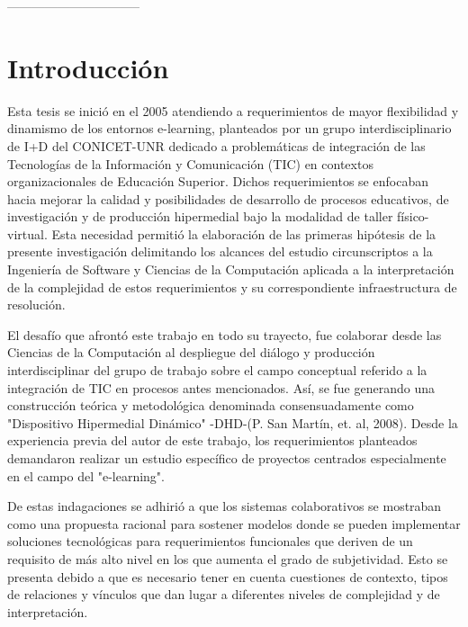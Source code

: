 --------------------------------
\parskip=0.6cm

\chapter{Introducción}\label{cap:1}


Esta tesis se inició en el 2005 atendiendo a requerimientos de mayor flexibilidad y dinamismo de los entornos e-learning, planteados por un grupo interdisciplinario de I+D del CONICET-UNR dedicado a problemáticas de integración de las Tecnologías de la Información y Comunicación (TIC) en contextos organizacionales de Educación Superior. 
Dichos requerimientos se enfocaban hacia mejorar la calidad y posibilidades de desarrollo de procesos educativos, de investigación y de producción hipermedial bajo la
modalidad de taller físico-virtual. Esta necesidad permitió la elaboración de las
primeras hipótesis de la presente investigación delimitando los alcances del estudio circunscriptos a la
Ingeniería de Software y Ciencias de la Computación aplicada a la interpretación
de la complejidad de estos requerimientos y su correspondiente
infraestructura de resolución.

El desafío que afrontó este trabajo en todo su trayecto, fue colaborar desde las Ciencias de la Computación al despliegue del diálogo y producción interdisciplinar del grupo de trabajo sobre el campo conceptual referido a la integración de TIC en procesos antes mencionados. 
Así, se fue generando una construcción teórica y metodológica denominada consensuadamente como "Dispositivo Hipermedial Dinámico" -DHD-(P. San Martín, et. al, 2008). Desde la experiencia previa del autor de este trabajo, los requerimientos planteados demandaron realizar un estudio específico de proyectos centrados especialmente en el campo del "e-learning".

De estas indagaciones se adhirió a que los sistemas colaborativos se mostraban como una propuesta racional para sostener modelos
donde se pueden implementar soluciones tecnológicas para requerimientos
funcionales que deriven de un requisito de más alto nivel en los que aumenta
el grado de subjetividad. Esto se presenta  debido a que es necesario tener en cuenta
cuestiones de contexto, tipos de relaciones y vínculos que dan lugar a diferentes
niveles de complejidad y de interpretación. 

